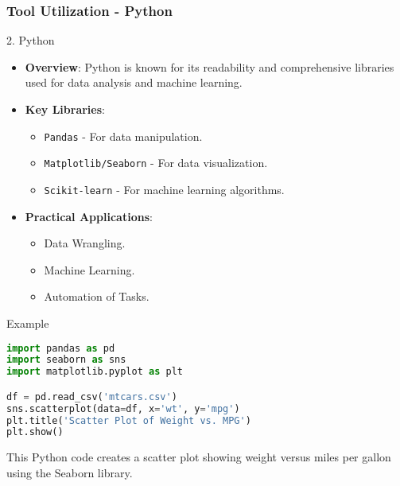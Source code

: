 \documentclass[aspectratio=169]{beamer}
\begin{document}
\begin{frame}[fragile]
    \frametitle{Tool Utilization - Python}
    \begin{block}{2. Python}
        \begin{itemize}
            \item \textbf{Overview}: Python is known for its readability and comprehensive libraries used for data analysis and machine learning.
            \item \textbf{Key Libraries}:
            \begin{itemize}
                \item \texttt{Pandas} - For data manipulation.
                \item \texttt{Matplotlib/Seaborn} - For data visualization.
                \item \texttt{Scikit-learn} - For machine learning algorithms.
            \end{itemize}
            \item \textbf{Practical Applications}:
            \begin{itemize}
                \item Data Wrangling.
                \item Machine Learning.
                \item Automation of Tasks.
            \end{itemize}
        \end{itemize}
    \end{block}
    
    \begin{block}{Example}
        \begin{lstlisting}[language=Python]
import pandas as pd
import seaborn as sns
import matplotlib.pyplot as plt

df = pd.read_csv('mtcars.csv')
sns.scatterplot(data=df, x='wt', y='mpg')
plt.title('Scatter Plot of Weight vs. MPG')
plt.show()
        \end{lstlisting}
        This Python code creates a scatter plot showing weight versus miles per gallon using the Seaborn library.
    \end{block}
\end{frame}
\end{document}
